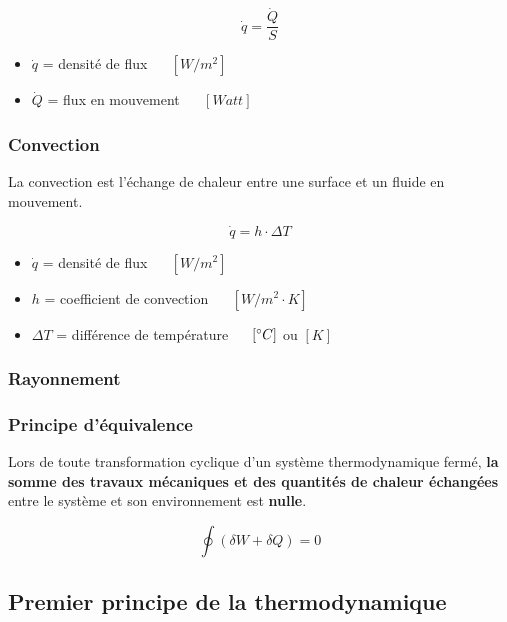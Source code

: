 \documentclass[]{article}
\begin{document}
$$ \dot{q} = \dfrac{\dot{Q}}{S} $$

\begin{itemize}
	\item 
		$ \dot{q} $ = densité de flux ~~ $[W/m^2]$
	\item 
		$ \dot{Q} $ = flux en mouvement ~~  $[Watt]$
\end{itemize}



\subsubsection{Convection}\label{convection}

La convection est l’échange de chaleur entre une surface et un fluide en mouvement.


$$ \dot{q} = h \cdot \Delta T $$

\begin{itemize}
	\item 
		$ \dot{q} $ = densité de flux ~~ $[W/m^2]$
	\item 
		$ h $ = coefficient de convection ~~  $[W/m^2 \cdot K]$
	\item
		$ \Delta T $ = différence de température ~~ $[\degree C]$ ou $[K]$
\end{itemize}



\subsubsection{Rayonnement}\label{rayonnement}





\subsubsection{Principe d’équivalence}\label{principe-equivalence}

Lors de toute transformation cyclique d’un système thermodynamique
fermé, \textbf{la somme des travaux mécaniques et des quantités de chaleur
échangées} entre le système et son environnement est \textbf{nulle}.

$$ \oint (\delta W + \delta Q) = 0 $$



\subsection{Premier principe de la thermodynamique}\label{premier-principe-thermo}
\end{document}
